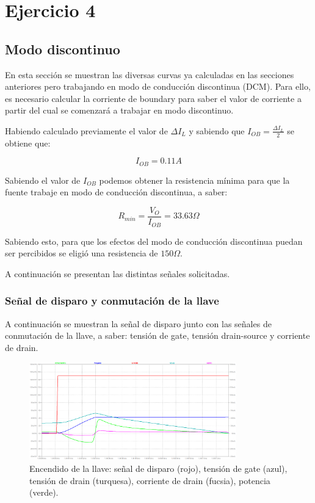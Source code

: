 \documentclass[e4_tp1_main.tex]{subfiles}
\begin{document}
	
	\section{Ejercicio 4}
	
	\subsection{Modo discontinuo}
	En esta sección se muestran las diversas curvas ya calculadas en las secciones anteriores pero trabajando en modo de conducción discontinua (DCM). Para ello, es necesario calcular la corriente de boundary para saber el valor de corriente a partir del cual se comenzará a trabajar en modo discontinuo.
	
	Habiendo calculado previamente el valor de $\Delta I_{L}$ y sabiendo que $I_{OB}=\frac{\Delta I_{L}}{2}$ se obtiene que:
	
	\begin{equation}
	I_{OB}=0.11A    
	\end{equation}
	
	Sabiendo el valor de $I_{OB}$ podemos obtener la resistencia mínima para que la fuente trabaje en modo de conducción discontinua, a saber:
	
	\begin{equation}
	R_{min}=\frac{V_O}{I_{OB}}=33.63\Omega
	\end{equation}
	
	Sabiendo esto, para que los efectos del modo de conducción discontinua puedan ser percibidos se eligió una resistencia de $150\Omega$.
	
	A continuación se presentan las distintas señales solicitadas.
	
	\subsubsection{Señal de disparo y conmutación de la llave}
	A continuación se muestran la señal de disparo junto con las señales de conmutación de la llave, a saber: tensión de gate, tensión drain-source y corriente de drain.
	
	\begin{figure}[H]
		\centering
		\includegraphics[width=0.8\textwidth]{images/ej4/fig1.png}
		\caption{Encendido de la llave: señal de disparo (rojo), tensi\'on de gate (azul), tensi\'on de drain (turquesa), corriente de drain (fucsia), potencia (verde).}
		\label{fig:my_label}
	\end{figure}
	
\end{document}
